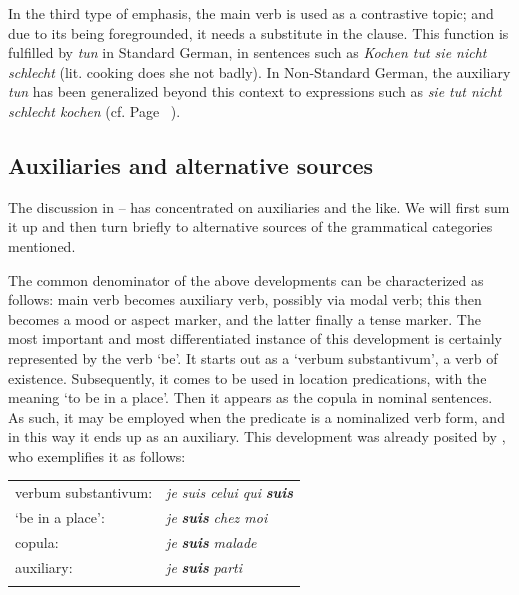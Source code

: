 \label{page35}In the third type of emphasis, the main verb is used as a contrastive topic; and due to its being foregrounded, it needs a substitute in the clause. This function is fulfilled by \textit{tun} in Standard German, in sentences such as \textit{Kochen tut sie nicht schlecht} (lit. cooking does she not badly). In Non-Standard German, the auxiliary \textit{tun} has been generalized beyond this context to expressions such as \textit{sie tut nicht schlecht kochen} (cf. Page~\pageref{page123}\chk%
).

\subsection{Auxiliaries and alternative sources} \label{sec:3.1.6}

The discussion in -- has concentrated on auxiliaries and the like. We will first sum it up and then turn briefly to alternative sources of the grammatical categories mentioned.

The common denominator of the above developments can be characterized as follows: main verb becomes auxiliary verb, possibly via modal verb; this then becomes a mood or aspect marker, and the latter finally a tense marker. The most important and most differentiated instance of this development is certainly represented by the verb ‘be’. It starts out as a ‘verbum substantivum’, a verb of existence. Subsequently, it comes to be used in location predications, with the meaning ‘to be in a place’. Then it appears as the copula in nominal sentences. As such, it may be employed when the predicate is a nominalized verb form, and in this way it ends up as an auxiliary. This development was already posited by \citet[131]{Meillet1912}, who exemplifies it as follows:

\begin{table}
\begin{tabular}{ll}
\lsptoprule
verbum substantivum: & \textit{je suis celui qui }\textbf{\textit{suis}}\\
‘be in a place’: & \textit{je }\textbf{\textit{suis}}\textit{ chez moi}\\
copula: & \textit{je }\textbf{\textit{suis}}\textit{ malade}\\
auxiliary: & \textit{je }\textbf{\textit{suis}}\textit{ parti}\\
\lspbottomrule
\end{tabular}
\end{table}

